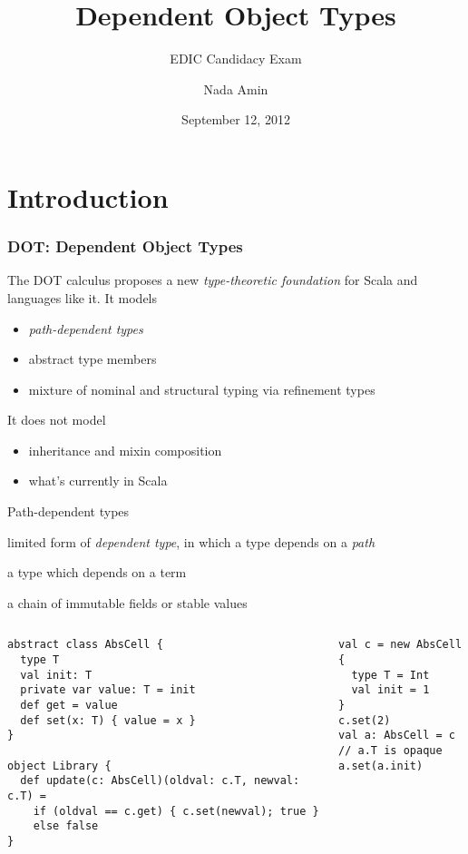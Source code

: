 \documentclass{beamer}
\title{Dependent Object Types}
\subtitle{EDIC Candidacy Exam}
\author{Nada Amin}
\institute{LAMP, I\&C, EPFL}
\date{September 12, 2012}
\begin{document}
\frame{\titlepage}

\section{Introduction}

\begin{frame}
\frametitle{DOT: Dependent Object Types}

The DOT calculus proposes a new \emph{type-theoretic foundation} for Scala
and languages like it. It models
\begin{itemize}
\item \emph{path-dependent types}
\item abstract type members
\item mixture of nominal and structural typing via refinement types
\end{itemize}

It does not model
\begin{itemize}
\item inheritance and mixin composition
\item what's currently in Scala
\end{itemize}

\end{frame}

\begin{frame}[fragile]{Path-dependent types}

\begin{description}
\item[path-dependent type] limited form of \emph{dependent type}, in which a type depends on a \emph{path}
\item[dependent type] a type which depends on a term
\item[path] a chain of immutable fields or stable values
\end{description}

\begin{columns}
\begin{column}[t]{5cm}
\begin{verbatim}
abstract class AbsCell {
  type T
  val init: T
  private var value: T = init
  def get = value
  def set(x: T) { value = x }
}

object Library {
  def update(c: AbsCell)(oldval: c.T, newval: c.T) =
    if (oldval == c.get) { c.set(newval); true }
    else false
}
\end{verbatim}
\end{column}
\begin{column}[t]{5cm}
\begin{verbatim}
val c = new AbsCell {
  type T = Int
  val init = 1
}
c.set(2)
val a: AbsCell = c
// a.T is opaque
a.set(a.init)
\end{verbatim}
\end{column}
\end{columns}
\end{frame}
\end{document}

